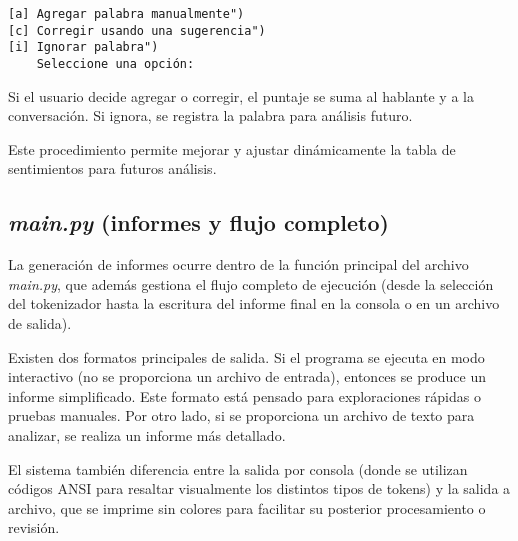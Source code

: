 \begin{verbatim}
[a] Agregar palabra manualmente")
[c] Corregir usando una sugerencia")
[i] Ignorar palabra")
    Seleccione una opción:
\end{verbatim}

Si el usuario decide agregar o corregir, el puntaje se suma al hablante y a la conversación. Si
ignora, se registra la palabra para análisis futuro.

Este procedimiento permite mejorar y ajustar dinámicamente la tabla de sentimientos para
futuros análisis.

\subsection{\textit{main.py} (informes y flujo completo)}

La generación de informes ocurre dentro de la función principal del archivo \textit{main.py},
que además gestiona el flujo completo de ejecución (desde la selección del tokenizador hasta la
escritura del informe final en la consola o en un archivo de salida).

Existen dos formatos principales de salida. Si el programa se ejecuta en modo interactivo (no
se proporciona un archivo de entrada), entonces se produce un informe simplificado. Este
formato está pensado para exploraciones rápidas o pruebas manuales. Por otro lado, si se
proporciona un archivo de texto para analizar, se realiza un informe más detallado.

El sistema también diferencia entre la salida por consola (donde se utilizan códigos ANSI para
resaltar visualmente los distintos tipos de tokens) y la salida a archivo, que se imprime sin
colores para facilitar su posterior procesamiento o revisión.
